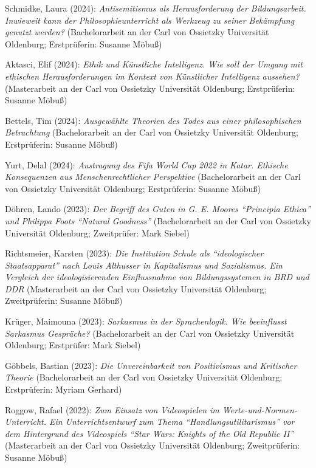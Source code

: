 \documentclass[a4paper,10pt]{article}
\newenvironment{literature}{%
   \parskip6pt\parindent0pt\raggedright
   \def\lititem{\hangindent=1cm\hangafter1}}{%
   \par\ignorespaces}
\begin{document}
\begin{literature}
\lititem Schmidke, Laura (2024): \textit{Antisemitismus als Herausforderung der Bildungsarbeit. Inwieweit kann der Philosophieunterricht als Werkzeug zu seiner Bekämpfung genutzt werden?} (Bachelorarbeit an der Carl von Ossietzky Universität Oldenburg; Erstprüferin: Susanne Möbuß)

\lititem Aktasci, Elif (2024): \textit{Ethik und Künstliche Intelligenz. Wie soll der Umgang mit ethischen Herausforderungen im Kontext von Künstlicher Intelligenz aussehen?} (Masterarbeit an der Carl von Ossietzky Universität Oldenburg; Erstprüferin: Susanne Möbuß)

\lititem Bettels, Tim (2024): \textit{Ausgewählte Theorien des Todes aus einer philosophischen Betrachtung} (Bachelorarbeit an der Carl von Ossietzky Universität Oldenburg; Erstprüferin: Susanne Möbuß)

\lititem Yurt, Delal (2024): \textit{Austragung des Fifa World Cup 2022 in Katar. Ethische Konsequenzen aus Menschenrechtlicher Perspektive} (Bachelorarbeit an der Carl von Ossietzky Universität Oldenburg; Erstprüferin: Susanne Möbuß)

\lititem Döhren, Lando (2023): \textit{Der Begriff des Guten in G. E. Moores \enquote{Principia Ethica} und Philippa Foots \enquote{Natural Goodness}} (Bachelorarbeit an der Carl von Ossietzky Universität Oldenburg; Zweitprüfer: Mark Siebel)

\lititem Richtsmeier, Karsten (2023): \textit{Die Institution Schule als \enquote{ideologischer Staatsapparat} nach Louis Althusser in Kapitalismus und Sozialismus. Ein Vergleich der ideologisierenden Einflussnahme von Bildungssystemen in BRD und DDR} (Masterarbeit an der Carl von Ossietzky Universität Oldenburg; Zweitprüferin: Susanne Möbuß)

\lititem Krüger, Maimouna (2023): \textit{Sarkasmus in der Sprachenlogik. Wie beeinflusst Sarkasmus Gespräche?} (Bachelorarbeit an der Carl von Ossietzky Universität Oldenburg; Erstprüfer: Mark Siebel)

\lititem Göbbels, Bastian (2023): \textit{Die Unvereinbarkeit von Positivismus und Kritischer Theorie} (Bachelorarbeit an der Carl von Ossietzky Universität Oldenburg; Erstprüferin: Myriam Gerhard)

\lititem Roggow, Rafael (2022): \textit{Zum Einsatz von Videospielen im Werte-und-Normen-Unterricht. Ein Unterrichtsentwurf zum Thema \enquote{Handlungsutilitarismus} vor dem Hintergrund des Videospiels \enquote{Star Wars: Knights of the Old Republic II}} (Masterarbeit an der Carl von Ossietzky Universität Oldenburg; Zweitprüferin: Susanne Möbuß)


\end{literature}
\end{document}
